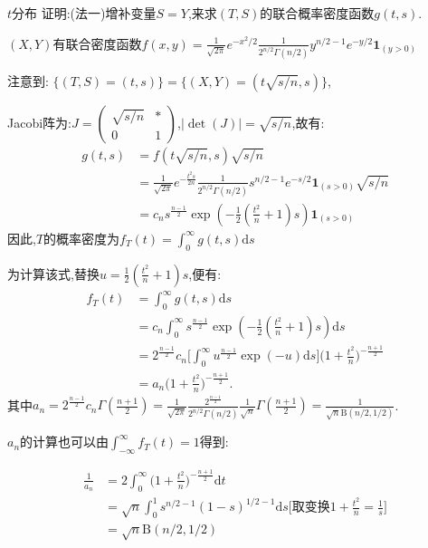 	\begin{frame}{$t$分布}
		证明:(法一)增补变量$S = Y$,来求$(T,S)$的联合概率密度函数$g(t,s)$.
		
		$(X,Y)$有联合密度函数$f(x,y) = \frac{1}{\sqrt{2\pi}}e^{-x^2/2} \frac{1}{2^{n/2}\Gamma(n/2)}y^{n/2-1}e^{-y/2}\bm{1}_{(y>0)}$
		
		注意到: $\{(T,S)=(t,s)\} = \{(X,Y) = (t\sqrt{s/n},s)\}$,
		
		Jacobi阵为:$J = \begin{pmatrix} \sqrt{s/n} & * \\ 0 & 1 \end{pmatrix}$,$|\det(J)| = \sqrt{s/n}$,故有:
		\begin{equation}
			\begin{split}
				g(t,s) &= f(t\sqrt{s/n},s) \sqrt{s/n} \\
				&= \frac{1}{\sqrt{2\pi}}e^{-\frac{t^2s}{2n}} \frac{1}{2^{n/2}\Gamma(n/2)}s^{n/2-1}e^{-s/2}\bm{1}_{(s>0)}\sqrt{s/n} \\
				&= c_n s^{\frac{n-1}{2}}\exp(-\frac{1}{2}(\frac{t^2}{n}+1)s)\bm{1}_{(s>0)}
			\end{split}
		\end{equation}
		因此,$T$的概率密度为$f_T(t) = \int_{0}^{\infty}g(t,s)\mathrm{d}s$
	\end{frame}
	
	\begin{frame}
		为计算该式,替换$u = \frac{1}{2}(\frac{t^2}{n}+1)s$,便有:
		\begin{equation}
			\begin{split}
				f_T(t) &= \int_{0}^{\infty}g(t,s)\mathrm{d}s \\
				&= c_n\int_{0}^{\infty}s^{\frac{n-1}{2}}\exp(-\frac{1}{2}(\frac{t^2}{n}+1)s)\mathrm{d}s \\
				&= 2^{\frac{n-1}2}c_n\bigg[\int_{0}^{\infty}u^{\frac{n-1}{2}}\exp(-u)\mathrm{d}s\bigg] \bigg(1+\frac{t^2}{n}\bigg)^{-\frac{n+1}{2}} \\
				&= a_n \bigg(1+\frac{t^2}{n}\bigg)^{-\frac{n+1}{2}}.
			\end{split}
		\end{equation}
		其中$a_n = 2^{\frac{n-1}2}c_n \Gamma(\frac{n+1}{2}) = \frac{1}{\sqrt{2\pi}}\frac{2^{\frac{n-1}2}}{2^{n/2}\Gamma(n/2)}\frac{1}{\sqrt{n}}\Gamma(\frac{n+1}{2}) = \frac{1}{\sqrt{n}\mathrm{B}(n/2,1/2)}$.
	\end{frame}

	\begin{frame}
		$a_n$的计算也可以由$\int_{-\infty}^{\infty}f_T(t)=1$得到:
		
		\begin{equation}
			\begin{split}
			\frac{1}{a_n} &= 2\int_{0}^{\infty}\bigg(1+\frac{t^2}{n}\bigg)^{-\frac{n+1}{2}}\mathrm{d}t \\
			&= \sqrt{n}\int_{0}^{1}s^{n/2-1}(1-s)^{1/2-1}\mathrm{d}s \big[\text{取变换}1+\frac{t^2}{n}=\frac{1}{s}\big] \\
			&= \sqrt{n}\mathrm{B}(n/2,1/2)
			\end{split}
		\end{equation}
	\end{frame}

